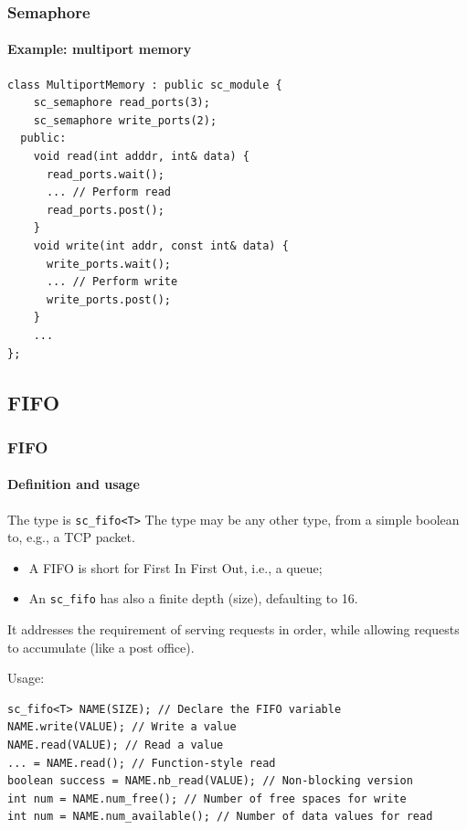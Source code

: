 \begin{frame}[fragile]
\frametitle{Semaphore}
\framesubtitle{Example: multiport memory}

{\scriptsize 
\begin{verbatim}
class MultiportMemory : public sc_module {
    sc_semaphore read_ports(3);
    sc_semaphore write_ports(2);
  public: 
    void read(int adddr, int& data) {
      read_ports.wait();
      ... // Perform read
      read_ports.post();
    }
    void write(int addr, const int& data) {
      write_ports.wait();
      ... // Perform write
      write_ports.post();
    }
    ...
};
\end{verbatim}
}

\end{frame}

\subsection{FIFO}

\begin{frame}[fragile]
\frametitle{FIFO}
\framesubtitle{Definition and usage}

\begin{block}{The type is \texttt{sc\_fifo<T>}}
The type may be any other type, from a simple boolean to, e.g., a TCP packet.
\begin{itemize}
\item A FIFO is short for First In First Out, i.e., a queue;
\item An \texttt{sc\_fifo} has also a finite depth (size), defaulting to 16.
\end{itemize}
It addresses the requirement of serving requests in order, while allowing requests to accumulate (like a post office).
\end{block}
\pause
\begin{block}{Usage:}
\vspace{-1em}
{\scriptsize 
\begin{verbatim}
sc_fifo<T> NAME(SIZE); // Declare the FIFO variable
NAME.write(VALUE); // Write a value
NAME.read(VALUE); // Read a value
... = NAME.read(); // Function-style read
boolean success = NAME.nb_read(VALUE); // Non-blocking version
int num = NAME.num_free(); // Number of free spaces for write
int num = NAME.num_available(); // Number of data values for read
\end{verbatim}
}
\vspace{-1em}
\end{block}
\end{frame}

